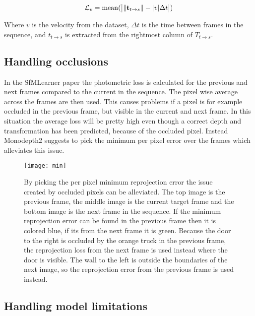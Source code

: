 \[
\mathcal{L}_{v} = \operatorname{mean}(\bigr{|} \| \textbf{t}_{t \rightarrow s} \| - |v|\Delta t \bigr{|})
\]

Where $v$ is the velocity from the dataset, $\Delta t$ is the time between frames in the sequence, and $t_{t\rightarrow s}$ is extracted from the rightmost column of $T_{t\rightarrow s}$.
\fi

\subsection{Handling occlusions}
\label{sec:occlusion}

\iffalse
\paragraph{Disparity loss} To encourage background depths (low disparities) in shadows of the depth map where occlusion has occurred a penalty on the disparity can be added $ \mathcal{L}_{o} =|d_t|. $
\fi

In the SfMLearner paper the photometric loss is calculated for the previous and next frames compared to the current in the sequence. The pixel wise average across the frames are then used. This causes problems if a pixel is for example occluded in the previous frame, but visible in the current and next frame. In this situation the average loss will be pretty high even though a correct depth and transformation has been predicted, because of the occluded pixel. Instead Monodepth2 suggests to pick the minimum per pixel error over the frames which alleviates this issue. 

\begin{figure}[H]
	\centering
	\texttt{[image: min]}
	\caption{By picking the per pixel minimum reprojection error the issue created by occluded pixels can be alleviated. The top image is the previous frame, the middle image is the current target frame and the bottom image is the next frame in the sequence. If the minimum reprojection error can be found in the previous frame then it is colored blue, if its from the next frame it is green. Because the door to the right is occluded by the orange truck in the previous frame, the reprojection loss from the next frame is used instead where the door is visible. The wall to the left is outside the boundaries of the next image, so the reprojection error from the previous frame is used instead.}
	\label{fig:min}
\end{figure}

\subsection{Handling model limitations}
\label{sec:modellimit}

